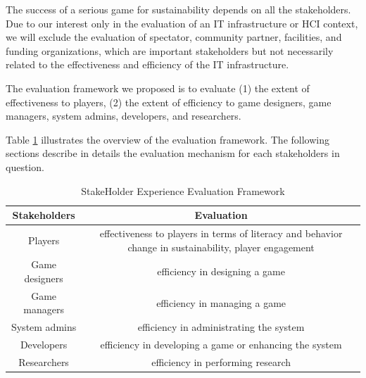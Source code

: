 \documentclass{sigchi}
\newcommand\tabhead[1]{\small\textbf{#1}}
\begin{document}
The success of a serious game for sustainability depends on all the stakeholders. Due to our interest only in the evaluation of an IT infrastructure or HCI context, we will exclude the evaluation of spectator, community partner, facilities, and funding organizations, which are important stakeholders but not necessarily related to the effectiveness and efficiency of the IT infrastructure.

The evaluation framework we proposed is to evaluate (1) the extent of effectiveness to players, (2) the extent of efficiency to game designers, game managers, system admins, developers, and researchers.

Table \ref{tab:evaluation-framework} illustrates the overview of the evaluation framework. The following sections describe in details the evaluation mechanism for each stakeholders in question.

\begin{table}
  \centering
  \begin{tabular}{|c|c|}
    \hline
    \multicolumn{1}{|p{0.3\columnwidth}|}{\centering\tabhead{Stakeholders}} &
    \multicolumn{1}{|p{0.65\columnwidth}|}{\centering\tabhead{Evaluation}} \\
    \hline
    \multicolumn{1}{|p{0.3\columnwidth}|}{Players} & \multicolumn{1}{|p{0.65\columnwidth}|}{effectiveness to players in terms of literacy and behavior change in sustainability, player engagement} \\
    \hline
    \multicolumn{1}{|p{0.3\columnwidth}|}{Game designers} & \multicolumn{1}{|p{0.65\columnwidth}|}{efficiency in designing a game} \\
    \hline
    \multicolumn{1}{|p{0.3\columnwidth}|}{Game managers} & \multicolumn{1}{|p{0.65\columnwidth}|}{efficiency in managing a game} \\
    \hline
    \multicolumn{1}{|p{0.3\columnwidth}|}{System admins} & \multicolumn{1}{|p{0.65\columnwidth}|}{efficiency in administrating the system} \\
    \hline
    \multicolumn{1}{|p{0.3\columnwidth}|}{Developers} & \multicolumn{1}{|p{0.65\columnwidth}|}{efficiency in developing a game or enhancing the system} \\
    \hline
    \multicolumn{1}{|p{0.3\columnwidth}|}{Researchers} & \multicolumn{1}{|p{0.65\columnwidth}|}{efficiency in performing research} \\
    \hline
  \end{tabular}
  \caption{StakeHolder Experience Evaluation Framework}
  \label{tab:evaluation-framework}
\end{table}
\end{document}
